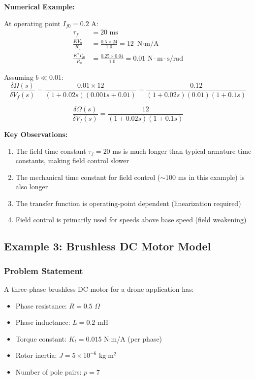 \textbf{Numerical Example:}

At operating point $I_{f0} = 0.2$ A:
\begin{align}
    \tau_f &= 20 \text{ ms} \\
    \frac{K V_a}{R_a} &= \frac{0.5 \times 24}{1.0} = 12 \text{ N$\cdot$m/A} \\
    \frac{K^2 I_{f0}^2}{R_a} &= \frac{0.25 \times 0.04}{1.0} = 0.01 \text{ N$\cdot$m$\cdot$s/rad}
\end{align}

Assuming $b \ll 0.01$:
\begin{equation}
    \frac{\delta\Omega(s)}{\delta V_f(s)} = \frac{0.01 \times 12}{(1 + 0.02s)(0.001s + 0.01)} = \frac{0.12}{(1 + 0.02s)(0.01)(1 + 0.1s)}
\end{equation}

\begin{equation}
    \boxed{\frac{\delta\Omega(s)}{\delta V_f(s)} = \frac{12}{(1 + 0.02s)(1 + 0.1s)}}
\end{equation}

\textbf{Key Observations:}

\begin{enumerate}
    \item The field time constant $\tau_f = 20$ ms is much longer than typical armature time constants, making field control slower
    \item The mechanical time constant for field control ($\sim 100$ ms in this example) is also longer
    \item The transfer function is operating-point dependent (linearization required)
    \item Field control is primarily used for speeds above base speed (field weakening)
\end{enumerate}

\subsection{Example 3: Brushless DC Motor Model}

\subsubsection{Problem Statement}

A three-phase brushless DC motor for a drone application has:
\begin{itemize}
    \item Phase resistance: $R = 0.5$ $\Omega$
    \item Phase inductance: $L = 0.2$ mH
    \item Torque constant: $K_t = 0.015$ N$\cdot$m/A (per phase)
    \item Rotor inertia: $J = 5 \times 10^{-6}$ kg$\cdot$m$^2$
    \item Number of pole pairs: $p = 7$
\end{itemize}

